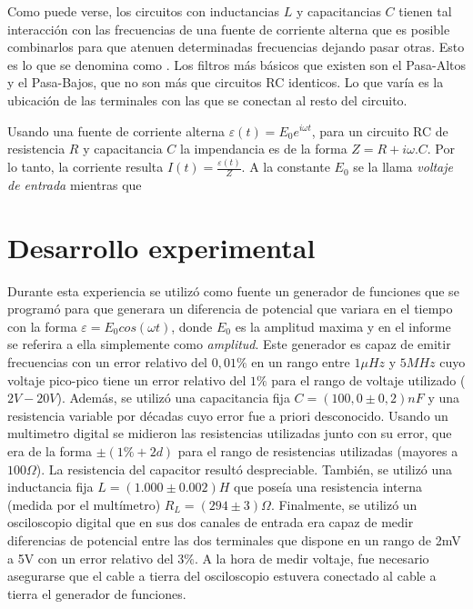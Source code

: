 \documentclass[11pt,a4paper]{article}
\begin{document}
Como puede verse, los circuitos con inductancias $L$ y capacitancias $C$ tienen tal interacción con las frecuencias de una fuente de corriente alterna que es posible combinarlos para que atenuen determinadas frecuencias dejando pasar otras. Esto es lo que se denomina como . Los filtros más básicos que existen son el Pasa-Altos y el Pasa-Bajos, que no son más que circuitos RC identicos. Lo que varía es la ubicación de las terminales con las que se conectan al resto del circuito. 

Usando una fuente de corriente alterna $\varepsilon(t) = E_{0}e^{i\omega t}$, para un circuito RC de resistencia $R$ y capacitancia $C$ la impendancia es de la forma $Z = R+i\omega.C$. Por lo tanto, la corriente resulta $I(t) = \frac{\varepsilon(t)}{Z}$. A la constante $E_0$ se la llama \textit{voltaje de entrada} mientras que


\section{Desarrollo experimental}

Durante esta experiencia se utilizó como fuente un generador de funciones que se programó para que generara un diferencia de potencial que variara en el tiempo con la forma $\varepsilon = E_{0}cos(\omega t)$, donde $E_{0}$ es la amplitud maxima y en el informe se referira a ella simplemente como \textit{amplitud}. Este generador es capaz de emitir frecuencias con un error relativo del $0,01\%$ en un rango entre $1\mu Hz$ y $5MHz$ cuyo voltaje pico-pico tiene un error relativo del $1\%$ para el rango de voltaje utilizado ($2V-20V$). Además, se utilizó una capacitancia fija $C = (100,0 \pm 0,2)nF$ y una resistencia variable por décadas cuyo error fue a priori desconocido. Usando un multimetro digital se midieron las resistencias utilizadas junto con su error, que era de la forma $\pm(1\%+2d)$ para el rango de resistencias utilizadas (mayores a $100\Omega$). La resistencia del capacitor resultó despreciable. También, se utilizó una inductancia fija $L = (1.000 \pm 0.002) H$ que poseía una resistencia interna (medida por el multímetro) $R_L = (294 \pm 3) \Omega$.
Finalmente, se utilizó un osciloscopio digital que en sus dos canales de entrada era capaz de medir diferencias de potencial entre las dos terminales que dispone en un rango de 2mV a 5V con un error relativo del $3\%$. A la hora de medir voltaje, fue necesario asegurarse que el cable a tierra del osciloscopio estuvera conectado al cable a tierra el generador de funciones. 
\end{document}
